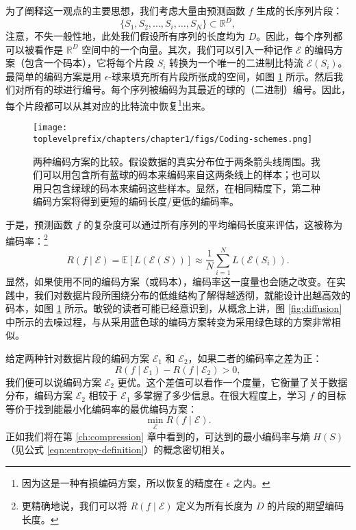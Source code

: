 \documentclass[../../book-main.tex]{subfiles}
\begin{document}
为了阐释这一观点的主要思想，我们考虑大量由预测函数 $f$ 生成的长序列片段：
\begin{equation}
    \{S_1, S_2, \ldots, S_i, \ldots, S_N\} \subset \mathbb{R}^D,
\end{equation}
注意，不失一般性地，此处我们假设所有序列的长度均为 $D$。因此，每个序列都可以被看作是 $\mathbb{R}^D$ 空间中的一个向量。其次，我们可以引入一种记作 $\mathcal E$ 的编码方案（包含一个码本），它将每个片段 $S_i$ 转换为一个唯一的二进制比特流 $\mathcal{E}(S_i)$。最简单的编码方案是用 $\epsilon$-球来填充所有片段所张成的空间，如图 \ref{fig:coding-schemes} 所示。然后我们对所有的球进行编号。每个序列被编码为其最近的球的（二进制）编号。因此，每个片段都可以从其对应的比特流中恢复\footnote{因为这是一种有损编码方案，所以恢复的精度在 $\epsilon$ 之内。}出来。
\begin{figure}
    \centering
    \texttt{[image: \\toplevelprefix/chapters/chapter1/figs/Coding-schemes.png]}
    \caption{两种编码方案的比较。假设数据的真实分布位于两条箭头线周围。我们可以用包含所有蓝球的码本来编码来自这两条线上的样本；也可以用只包含绿球的码本来编码这些样本。显然，在相同精度下，第二种编码方案将得到更短的编码长度/更低的编码率。}
    \label{fig:coding-schemes}
\end{figure}

于是，预测函数 $f$ 的复杂度可以通过所有序列的平均编码长度来评估，这被称为编码率：\footnote{更精确地说，我们可以将 $R(f\mid \mathcal{E})$ 定义为所有长度为 $D$ 的片段的期望编码长度。}
\begin{equation}
   R(f \mid \mathcal E) = \mathbb{E}[L(\mathcal{E}(S))] \approx \frac{1}{N}\sum_{i=1}^N L(\mathcal{E}(S_i)). 
   \label{eqn:coding-rate}
\end{equation}
显然，如果使用不同的编码方案（或码本），编码率这一度量也会随之改变。在实践中，我们对数据片段所围绕分布的低维结构了解得越透彻，就能设计出越高效的码本，如图 \ref{fig:coding-schemes} 所示。敏锐的读者可能已经意识到，从概念上讲，图 \ref{fig:diffusion} 中所示的去噪过程，与从采用蓝色球的编码方案转变为采用绿色球的方案非常相似。


给定两种针对数据片段的编码方案 $\mathcal{E}_1$ 和 $\mathcal{E}_2$，如果二者的编码率之差为正：
\begin{equation}
   R(f \mid \mathcal E_1) -  R(f \mid \mathcal E_2) > 0, 
\end{equation}
我们便可以说编码方案 $\mathcal{E}_2$ 更优。这个差值可以看作一个度量，它衡量了关于数据分布，编码方案 $\mathcal{E}_2$ 相较于 $\mathcal{E}_1$ 多掌握了多少信息。在很大程度上，学习 $f$ 的目标等价于找到能最小化编码率的最优编码方案：
\begin{equation}
   \min_{\mathcal{E}} R(f \mid \mathcal E). 
\end{equation}
正如我们将在第 \ref{ch:compression} 章中看到的，可达到的最小编码率与熵 $H(S)$（见公式 \eqref{eqn:entropy-definition}）的概念密切相关。
\end{document}
